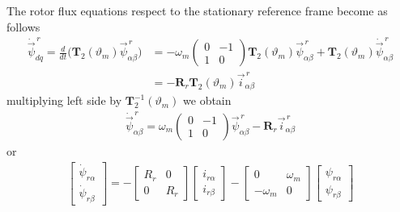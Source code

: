 \documentclass[11pt,a4paper,oneside]{book}
\numberwithin{equation}{section}
\theoremstyle{it}
\theoremstyle{definition}
\begin{document}
The rotor flux equations respect to the stationary reference frame become as 
follows
\begin{equation}\label{im_eq_17}
	\begin{aligned}
		\dot{\vec{\psi}}_{dq}^{\,r}=\frac{d}{dt}\Bigg(\mathbf{T}_2(\vartheta_m) 
		{\vec{\psi}}_{\alpha\beta}^{\,r}\Bigg)&=-\omega_m\begin{pmatrix}
			0&-1\\1&0\end{pmatrix}\mathbf{T}_2(\vartheta_m){\vec{\psi}}_{\alpha\beta}^{\,r}
		+\mathbf{T}_2(\vartheta_m)\dot{\vec{\psi}}_{\alpha\beta}^{\,r}\\[8pt]
		&=-\mathbf{R}_r\mathbf{T}_2(\vartheta_m){\vec{i}}_{\alpha\beta}^{\,r}
	\end{aligned}
\end{equation}
multiplying left side by $\mathbf{T}_2^{-1}(\vartheta_m)$ we obtain
\begin{equation}\label{im_eq_18}
	\begin{aligned}
		\dot{\vec{\psi}}_{\alpha\beta}^{\,r}=\omega_m\begin{pmatrix} 
			0&-1\\1&0\end{pmatrix} 
		{\vec{\psi}}_{\alpha\beta}^{\,r}-\mathbf{R}_r{\vec{i}}_{\alpha\beta}^{\,r}
	\end{aligned}
\end{equation}
or
\begin{equation}\label{im_eq_19}
	\begin{aligned}
		\left[
		\begin{matrix}
			\dot{\psi}_{r\alpha} \\[6pt]
			\dot{\psi}_{r\beta}
		\end{matrix} \right] = -
		\left[
		\begin{matrix}
			R_r & 0 \\[6pt]
			0 & R_r 
		\end{matrix} \right]
		\left[
		\begin{matrix}
			i_{r\alpha} \\[6pt]
			i_{r\beta}
		\end{matrix} \right] - 
		\left[
		\begin{matrix}
			0 & \omega_m \\[6pt]
			- \omega_m & 0
		\end{matrix} \right]
		\left[
		\begin{matrix}
			{\psi}_{r\alpha} \\[6pt]
			{\psi}_{r\beta}
		\end{matrix} \right]
	\end{aligned}
\end{equation}
\end{document}

